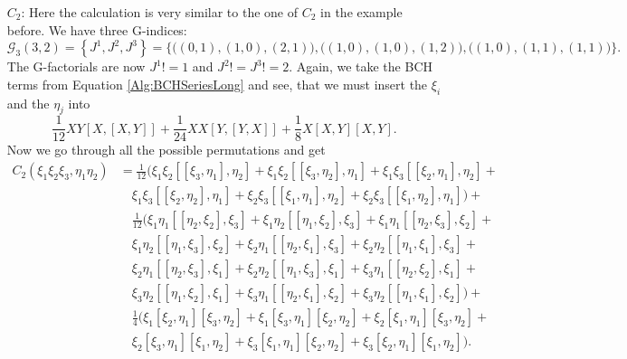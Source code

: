 \begin{itemize}
	\item[$C_2$:]
	Here the calculation is very similar to the one of $C_2$ in the example 
	before. We have three G-indices:
	\begin{equation*}
		\mathcal{G}_3(3,2) 
		=
		\left\{
			J^1, J^2, J^3
		\right\}
		= 
		\big\{ 
			\big( (0,1), (1,0), (2,1) \big), 
			\big( (1,0), (1,0), (1,2) \big), 
			\big( (1,0), (1,1), (1,1) \big) 
		\big\}.
	\end{equation*}
	The G-factorials are now $J^1! = 1$ and $J^2! = J^3! = 2$. Again, we take 
	the BCH terms from Equation \eqref{Alg:BCHSeriesLong} and see, that we 
	must insert the $\xi_i$ and the $\eta_j$ into
	\begin{equation*}
		\frac{1}{12} X Y [X, [X, Y]] +
		\frac{1}{24} X X [Y, [Y, X]] +
		\frac{1}{8} X [X, Y] [X, Y].
	\end{equation*}
	Now we go through all the possible permutations and get
	\begin{align*}
		C_2(\xi_1 \xi_2 \xi_3, \eta_1 \eta_2) 
		& = 
		\frac{1}{12} 
		\big( 
			\xi_1 \xi_2 [[\xi_3, \eta_1], \eta_2] + 
			\xi_1 \xi_2 [[\xi_3, \eta_2], \eta_1] + 
			\xi_1 \xi_3 [[\xi_2, \eta_1], \eta_2] +
		\\
		& \quad 
			\xi_1 \xi_3 [[\xi_2, \eta_2], \eta_1] + 
			\xi_2 \xi_3 [[\xi_1, \eta_1], \eta_2] + 
			\xi_2 \xi_3 [[\xi_1, \eta_2], \eta_1] 
		\big) +
		\\ 
		& \quad
		\frac{1}{12} 
		\big( 
			\xi_1 \eta_1 [[\eta_2, \xi_2], \xi_3] + 
			\xi_1 \eta_2 [[\eta_1, \xi_2], \xi_3] + 
			\xi_1 \eta_1 [[\eta_2, \xi_3], \xi_2] +
		\\
		& \quad
			\xi_1 \eta_2 [[\eta_1, \xi_3], \xi_2] + 
			\xi_2 \eta_1 [[\eta_2, \xi_1], \xi_3] + 
			\xi_2 \eta_2 [[\eta_1, \xi_1], \xi_3] +
		\\
		& \quad
			\xi_2 \eta_1 [[\eta_2, \xi_3], \xi_1] + 
			\xi_2 \eta_2 [[\eta_1, \xi_3], \xi_1] + 
			\xi_3 \eta_1 [[\eta_2, \xi_2], \xi_1] +
		\\
		& \quad
			\xi_3 \eta_2 [[\eta_1, \xi_2], \xi_1] + 
			\xi_3 \eta_1 [[\eta_2, \xi_1], \xi_2] + 
			\xi_3 \eta_2 [[\eta_1, \xi_1], \xi_2] 
		\big) +
		\\
		& \quad
		\frac{1}{4} 
		\big( 
			\xi_1 [\xi_2, \eta_1] [\xi_3, \eta_2] + 
			\xi_1 [\xi_3, \eta_1] [\xi_2, \eta_2] + 
			\xi_2 [\xi_1, \eta_1] [\xi_3, \eta_2] + 
		\\
		& \quad
			\xi_2 [\xi_3, \eta_1] [\xi_1, \eta_2] + 
			\xi_3 [\xi_1, \eta_1] [\xi_2, \eta_2] + 
			\xi_3 [\xi_2, \eta_1] [\xi_1, \eta_2] 
 		\big).
	\end{align*}


\end{itemize}
